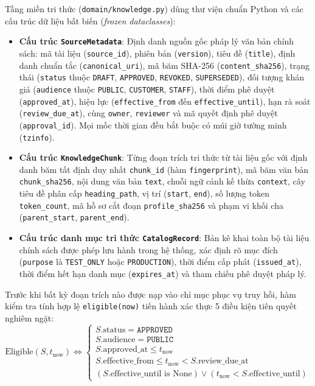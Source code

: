 Tầng miền tri thức (\texttt{domain/knowledge.py}) dùng thư viện chuẩn Python và các cấu trúc dữ liệu bất biến (\textit{frozen dataclasses}):
\begin{itemize}[nosep]
  \item \textbf{Cấu trúc \texttt{SourceMetadata}}: Định danh nguồn gốc pháp lý văn bản chính sách: mã tài liệu (\texttt{source\_id}), phiên bản (\texttt{version}), tiêu đề (\texttt{title}), định danh chuẩn tắc (\texttt{canonical\_uri}), mã băm SHA-256 (\texttt{content\_sha256}), trạng thái (\texttt{status} thuộc \texttt{DRAFT}, \texttt{APPROVED}, \texttt{REVOKED}, \texttt{SUPERSEDED}), đối tượng khán giả (\texttt{audience} thuộc \texttt{PUBLIC}, \texttt{CUSTOMER}, \texttt{STAFF}), thời điểm phê duyệt (\texttt{approved\_at}), hiệu lực (\texttt{effective\_from} đến \texttt{effective\_until}), hạn rà soát (\texttt{review\_due\_at}), cùng \texttt{owner}, \texttt{reviewer} và mã quyết định phê duyệt (\texttt{approval\_id}). Mọi mốc thời gian đều bắt buộc có múi giờ tường minh (\texttt{tzinfo}).
  \item \textbf{Cấu trúc \texttt{KnowledgeChunk}}: Từng đoạn trích tri thức từ tài liệu gốc với định danh băm tất định duy nhất \texttt{chunk\_id} (hàm \texttt{fingerprint}), mã băm văn bản \texttt{chunk\_sha256}, nội dung văn bản \texttt{text}, chuỗi ngữ cảnh kế thừa \texttt{context}, cây tiêu đề phân cấp \texttt{heading\_path}, vị trí (\texttt{start}, \texttt{end}), số lượng token \texttt{token\_count}, mã hồ sơ cắt đoạn \texttt{profile\_sha256} và phạm vi khối cha (\texttt{parent\_start}, \texttt{parent\_end}).
  \item \textbf{Cấu trúc danh mục tri thức \texttt{CatalogRecord}}: Bản kê khai toàn bộ tài liệu chính sách được phép lưu hành trong hệ thống, xác định rõ mục đích (\texttt{purpose} là \texttt{TEST\_ONLY} hoặc \texttt{PRODUCTION}), thời điểm cấp phát (\texttt{issued\_at}), thời điểm hết hạn danh mục (\texttt{expires\_at}) và tham chiếu phê duyệt pháp lý.
\end{itemize}

Trước khi bất kỳ đoạn trích nào được nạp vào chỉ mục phục vụ truy hồi, hàm kiểm tra tính hợp lệ \texttt{eligible(now)} tiến hành xác thực 5 điều kiện tiên quyết nghiêm ngặt:
\begin{equation}
\label{eq:source_eligibility}
\text{Eligible}(S, t_{\text{now}}) \iff \left\{
\begin{array}{l}
S.\text{status} = \texttt{APPROVED} \\
S.\text{audience} = \texttt{PUBLIC} \\
S.\text{approved\_at} \le t_{\text{now}} \\
S.\text{effective\_from} \le t_{\text{now}} < S.\text{review\_due\_at} \\
(S.\text{effective\_until} \text{ is None}) \lor (t_{\text{now}} < S.\text{effective\_until})
\end{array}
\right.
\end{equation}

